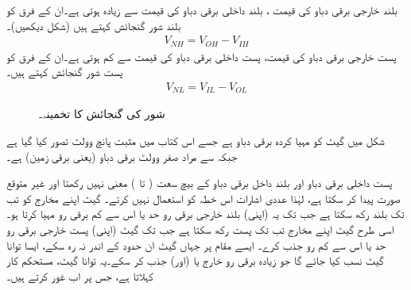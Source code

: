  بلند خارجی برقی دباو کی قیمت ، بلند داخلی برقی دباو کی قیمت سے زیادہ ہوتی ہے۔ان کے فرق کو بلند شور گنجائش  کہتے ہیں (شکل  دیکھیں)۔
\begin{align}
V_{NH}=V_{OH}-V_{IH}
\end{align}
 پست خارجی برقی دباو کی قیمت، پست داخلی برقی دباو کی قیمت سے کم ہوتی ہے۔ان کے فرق کو پست شور گنجائش  کہتے ہیں۔
\begin{align}
V_{NL}=V_{IL}-V_{OL}
\end{align}


\begin{figure}
\centering
{}
\caption{شور کی گنجائش کا تخمینہ۔}
\label{شکل_بوولین_گنجائش_شور}
\end{figure}


 شکل  میں  گیٹ کو مہیا کردہ برقی دباو ہے جسے اس کتاب میں مثبت پانچ وولٹ  تصور کیا گیا ہے جبکہ سے مراد صفر وولٹ برقی دباو (یعنی برقی زمین) ہے۔
 
 
پست داخلی برقی دباو اور بلند داخل برقی دباو کے بیچ سعت ( تا ) معنی نہیں رکھتا اور غیر متوقع صورت پیدا کر سکتا ہے، لہٰذا عددی اشارات اس خطہ کو استعمال نہیں کرتے۔ 
 گیٹ اپنے مخارج کو تب تک بلند رکھ سکتا ہے جب تک یہ (اپنی) بلند خارجی برقی رو حد یا اس سے کم برقی رو مہیا کرتا ہو۔اسی طرح گیٹ اپنے مخارج تب تک پست رکھ سکتا ہے جب تک گیٹ (اپنی) پست خارجی برقی رو حد یا اس سے کم رو جذب کرے۔ ایسے مقام پر جہاں گیٹ ان حدود کے اندر نہ رہ سکے، ایسا توانا گیٹ نسب کیا جائے گا جو زیادہ برقی رو خارج یا (اور) جذب کر سکے۔یہ توانا گیٹ، مستحکم کار کہلاتا ہے، جس پر اب غور کرتے ہیں۔
 	
